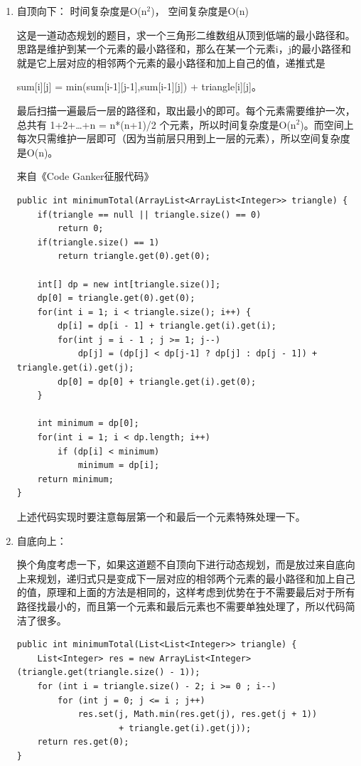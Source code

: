 \documentclass[12pt]{book}
\begin{document}
\begin{enumerate}
\item 自顶向下： 时间复杂度是O(n$^{\text{2}}$)， 空间复杂度是O(n)
\label{sec-14-2-9-1}

这是一道动态规划的题目，求一个三角形二维数组从顶到低端的最小路径和。思路是维护到某一个元素的最小路径和，那么在某一个元素i，j的最小路径和就是它上层对应的相邻两个元素的最小路径和加上自己的值，递推式是

sum[i][j] = min(sum[i-1][j-1],sum[i-1][j]) + triangle[i][j]。

最后扫描一遍最后一层的路径和，取出最小的即可。每个元素需要维护一次，总共有 1+2+\ldots{}+n = n*(n+1)/2 个元素，所以时间复杂度是O(n$^{\text{2}}$)。而空间上每次只需维护一层即可（因为当前层只用到上一层的元素），所以空间复杂度是O(n)。

来自《Code Ganker征服代码》
\lstset{language=java,label= ,caption= ,numbers=none}
\begin{lstlisting}
public int minimumTotal(ArrayList<ArrayList<Integer>> triangle) {  
    if(triangle == null || triangle.size() == 0)  
        return 0;  
    if(triangle.size() == 1)  
        return triangle.get(0).get(0);

    int[] dp = new int[triangle.size()];  
    dp[0] = triangle.get(0).get(0);  
    for(int i = 1; i < triangle.size(); i++) {  
        dp[i] = dp[i - 1] + triangle.get(i).get(i);  
        for(int j = i - 1 ; j >= 1; j--)  
            dp[j] = (dp[j] < dp[j-1] ? dp[j] : dp[j - 1]) + triangle.get(i).get(j);  
        dp[0] = dp[0] + triangle.get(i).get(0);  
    }

    int minimum = dp[0];  
    for(int i = 1; i < dp.length; i++) 
        if (dp[i] < minimum)
            minimum = dp[i];  
    return minimum;  
}
\end{lstlisting}

上述代码实现时要注意每层第一个和最后一个元素特殊处理一下。
\item 自底向上：
\label{sec-14-2-9-2}

换个角度考虑一下，如果这道题不自顶向下进行动态规划，而是放过来自底向上来规划，递归式只是变成下一层对应的相邻两个元素的最小路径和加上自己的值，原理和上面的方法是相同的，这样考虑到优势在于不需要最后对于所有路径找最小的，而且第一个元素和最后元素也不需要单独处理了，所以代码简洁了很多。
\lstset{language=java,label= ,caption= ,numbers=none}
\begin{lstlisting}
public int minimumTotal(List<List<Integer>> triangle) {
    List<Integer> res = new ArrayList<Integer>(triangle.get(triangle.size() - 1));
    for (int i = triangle.size() - 2; i >= 0 ; i--) 
        for (int j = 0; j <= i ; j++) 
            res.set(j, Math.min(res.get(j), res.get(j + 1))
                    + triangle.get(i).get(j));
    return res.get(0);
}
\end{lstlisting}
\end{enumerate}
\end{document}
